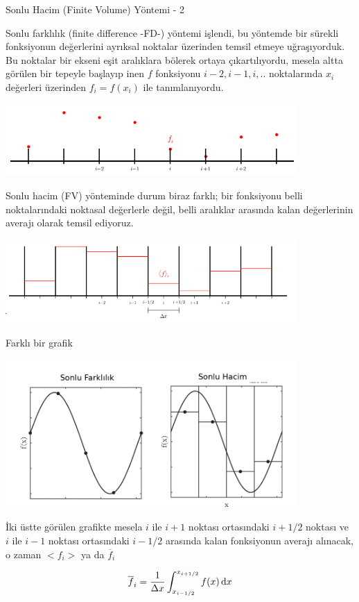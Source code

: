 \documentclass[12pt,fleqn]{article}\usepackage{../../common}
\begin{document}
Sonlu Hacim (Finite Volume) Yöntemi - 2

Sonlu farklılık (finite difference -FD-) yöntemi işlendi, bu yöntemde bir
sürekli fonksiyonun değerlerini ayrıksal noktalar üzerinden temsil etmeye
uğraşıyorduk.  Bu noktalar bir ekseni eşit aralıklara bölerek ortaya
çıkartılıyordu, mesela altta görülen bir tepeyle başlayıp inen $f$ fonksiyonu
$i-2,i-1,i,..$ noktalarında $x_i$ değerleri üzerinden $f_i = f(x_i)$ ile
tanımlanıyordu.

\includegraphics[width=30em]{13-22-29.png}

Sonlu hacim (FV) yönteminde durum biraz farklı; bir fonksiyonu belli
noktalarındaki noktasal değerlerle değil, belli aralıklar arasında kalan
değerlerinin averajı olarak temsil ediyoruz.

\includegraphics[width=30em]{13-22-34.png}

Farklı bir grafik

\includegraphics[width=30em]{13-16-00.png}

İki üstte görülen grafikte mesela $i$ ile $i+1$ noktası ortasındaki $i+1/2$
noktası ve $i$ ile $i-1$ noktası ortasındaki $i-1/2$ arasında kalan fonksiyonun
averajı alınacak, o zaman $< f_i >$ ya da $\overline{f}_i$

$$
\overline{f}_i = \frac{1}{\Delta x} \int _{x_{i-1/2}}^{x_{i+1/2}} f(x) \,\mathrm{d} x
$$
\end{document}
